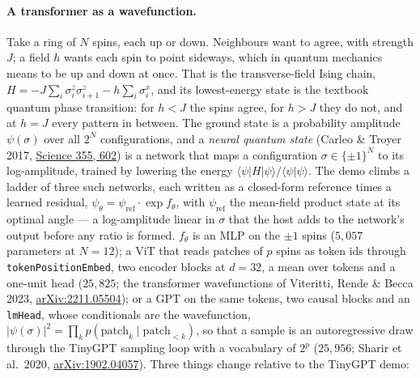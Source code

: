 \paragraph{A transformer as a wavefunction.} Take a ring of $N$ spins, each
up or down. Neighbours want to agree, with strength $J$; a field $h$ wants
each spin to point sideways, which in quantum mechanics means to be up and
down at once. That is the transverse-field Ising chain,
$H = -J \sum_i \sigma^z_i \sigma^z_{i+1} - h \sum_i \sigma^x_i$, and its
lowest-energy state is the textbook quantum phase transition: for $h < J$
the spins agree, for $h > J$ they do not, and at $h = J$ every pattern in
between. The ground state is a probability amplitude $\psi(\sigma)$ over
all $2^N$ configurations, and a \emph{neural quantum state} (Carleo \&
Troyer 2017, \href{https://doi.org/10.1126/science.aag2302}{Science 355,
602}) is a network that maps a configuration $\sigma \in \{\pm 1\}^N$ to
its log-amplitude, trained by lowering the energy
$\langle \psi | H | \psi \rangle / \langle \psi | \psi \rangle$. The demo
climbs a ladder of three such networks, each written as a closed-form
reference times a learned residual, $\psi_\theta = \psi_{\mathrm{ref}}
\cdot \exp f_\theta$, with $\psi_{\mathrm{ref}}$ the mean-field product
state at its optimal angle --- a log-amplitude linear in $\sigma$ that the
host adds to the network's output before any ratio is formed. $f_\theta$ is
an MLP on the $\pm 1$ spins ($5{,}057$ parameters at $N = 12$); a ViT that
reads patches of $p$ spins as token ids through
\texttt{tokenPositionEmbed}, two encoder blocks at $d = 32$, a mean over
tokens and a one-unit head ($25{,}825$; the transformer wavefunctions of
Viteritti, Rende \& Becca 2023,
\href{https://arxiv.org/abs/2211.05504}{arXiv:2211.05504}); or a GPT on
the same tokens, two causal blocks and an \texttt{lmHead}, whose
conditionals are the wavefunction, $|\psi(\sigma)|^2 = \prod_k
p(\mathrm{patch}_k \mid \mathrm{patch}_{<k})$, so that a sample is an
autoregressive draw through the TinyGPT sampling loop with a vocabulary of
$2^p$ ($25{,}956$; Sharir et al.\ 2020,
\href{https://arxiv.org/abs/1902.04057}{arXiv:1902.04057}). Three things
change relative to the TinyGPT demo:

